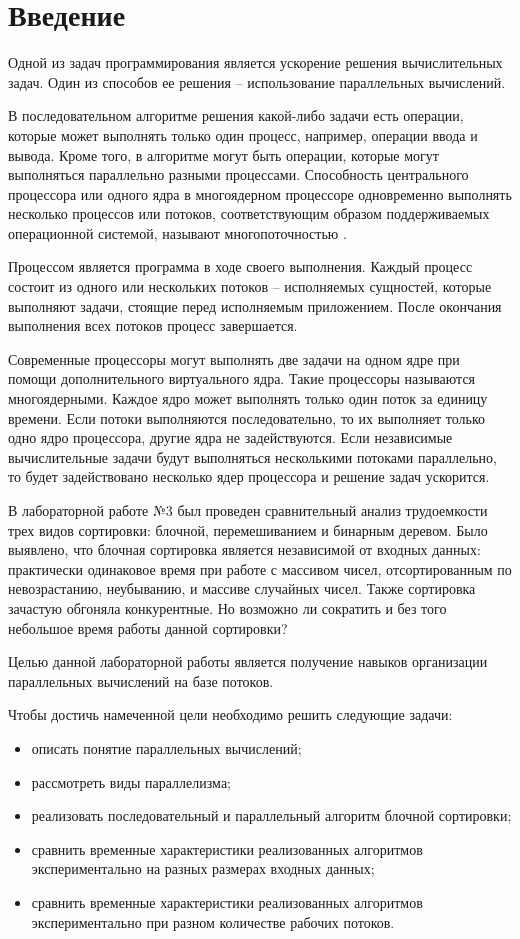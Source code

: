 \chapter*{Введение}

Одной из задач программирования является ускорение решения вычислительных задач. 
Один из способов ее решения -- использование параллельных вычислений.

В последовательном алгоритме решения какой-либо задачи есть операции, которые может выполнять только один процесс, например, операции ввода и вывода. 
Кроме того, в алгоритме могут быть операции, которые могут выполняться параллельно разными процессами. 
Способность центрального процессора или одного ядра в многоядерном процессоре одновременно выполнять несколько процессов или потоков, соответствующим образом поддерживаемых операционной системой, называют многопоточностью \cite{multithreading}.

Процессом является программа в ходе своего выполнения. 
Каждый процесс состоит из одного или нескольких потоков -- исполняемых сущностей, которые выполняют задачи, стоящие перед исполняемым приложением. 
После окончания выполнения всех потоков процесс завершается.

Современные процессоры могут выполнять две задачи на одном ядре при помощи дополнительного виртуального ядра. 
Такие процессоры называются многоядерными. 
Каждое ядро может выполнять только один поток за единицу времени. 
Если потоки выполняются последовательно, то их выполняет только одно ядро процессора, другие ядра не задействуются. 
Если независимые вычислительные задачи будут выполняться несколькими потоками параллельно, то будет задействовано несколько ядер процессора и решение задач ускорится.

В лабораторной работе №3 был проведен сравнительный анализ трудоемкости трех видов сортировки: блочной, перемешиванием и бинарным деревом. 
Было выявлено, что блочная сортировка является независимой от входных данных: практически одинаковое время при работе с массивом чисел, отсортированным по невозрастанию, неубыванию, и массиве случайных чисел. 
Также сортировка зачастую обгоняла конкурентные. 
Но возможно ли сократить и без того небольшое время работы данной сортировки? 

Целью данной лабораторной работы является получение навыков организации параллельных вычислений на базе потоков.

Чтобы достичь намеченной цели необходимо решить следующие задачи: 

\begin{itemize}
	\item описать понятие параллельных вычислений;
	\item рассмотреть виды параллелизма;
	\item реализовать последовательный и параллельный алгоритм блочной сортировки;
	\item сравнить временные характеристики реализованных алгоритмов экспериментально на разных размерах входных данных;
	\item сравнить временные характеристики реализованных алгоритмов экспериментально при разном количестве рабочих потоков.
\end{itemize}

